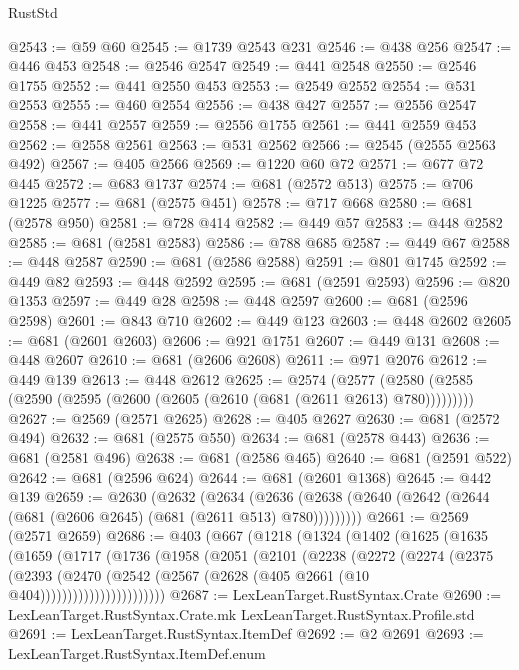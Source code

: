 \begin{lexlean}{RustStd}
\begin{coremodule}
@2543 := @59 @60
@2545 := @1739 @2543 @231
@2546 := @438 @256
@2547 := @446 @453
@2548 := @2546 @2547
@2549 := @441 @2548
@2550 := @2546 @1755
@2552 := @441 @2550 @453
@2553 := @2549 @2552
@2554 := @531 @2553
@2555 := @460 @2554
@2556 := @438 @427
@2557 := @2556 @2547
@2558 := @441 @2557
@2559 := @2556 @1755
@2561 := @441 @2559 @453
@2562 := @2558 @2561
@2563 := @531 @2562
@2566 := @2545 (@2555 @2563 @492)
@2567 := @405 @2566
@2569 := @1220 @60 @72
@2571 := @677 @72 @445
@2572 := @683 @1737
@2574 := @681 (@2572 @513)
@2575 := @706 @1225
@2577 := @681 (@2575 @451)
@2578 := @717 @668
@2580 := @681 (@2578 @950)
@2581 := @728 @414
@2582 := @449 @57
@2583 := @448 @2582
@2585 := @681 (@2581 @2583)
@2586 := @788 @685
@2587 := @449 @67
@2588 := @448 @2587
@2590 := @681 (@2586 @2588)
@2591 := @801 @1745
@2592 := @449 @82
@2593 := @448 @2592
@2595 := @681 (@2591 @2593)
@2596 := @820 @1353
@2597 := @449 @28
@2598 := @448 @2597
@2600 := @681 (@2596 @2598)
@2601 := @843 @710
@2602 := @449 @123
@2603 := @448 @2602
@2605 := @681 (@2601 @2603)
@2606 := @921 @1751
@2607 := @449 @131
@2608 := @448 @2607
@2610 := @681 (@2606 @2608)
@2611 := @971 @2076
@2612 := @449 @139
@2613 := @448 @2612
@2625 := @2574
    (@2577 (@2580 (@2585 (@2590 (@2595 (@2600 (@2605 (@2610 (@681 (@2611 @2613) @780)))))))))
@2627 := @2569 (@2571 @2625)
@2628 := @405 @2627
@2630 := @681 (@2572 @494)
@2632 := @681 (@2575 @550)
@2634 := @681 (@2578 @443)
@2636 := @681 (@2581 @496)
@2638 := @681 (@2586 @465)
@2640 := @681 (@2591 @522)
@2642 := @681 (@2596 @624)
@2644 := @681 (@2601 @1368)
@2645 := @442 @139
@2659 := @2630
    (@2632
      (@2634 (@2636 (@2638 (@2640 (@2642 (@2644 (@681 (@2606 @2645) (@681 (@2611 @513) @780)))))))))
@2661 := @2569 (@2571 @2659)
@2686 := @403
    (@667
      (@1218
        (@1324
          (@1402
            (@1625
              (@1635
                (@1659
                  (@1717
                    (@1736
                      (@1958
                        (@2051
                          (@2101
                            (@2238
                              (@2272
                                (@2274
                                  (@2375
                                    (@2393
                                      (@2470
                                        (@2542
                                          (@2567 (@2628 (@405 @2661 (@10 @404)))))))))))))))))))))))
@2687 := LexLeanTarget.RustSyntax.Crate
@2690 := LexLeanTarget.RustSyntax.Crate.mk LexLeanTarget.RustSyntax.Profile.std
@2691 := LexLeanTarget.RustSyntax.ItemDef
@2692 := @2 @2691
@2693 := LexLeanTarget.RustSyntax.ItemDef.enum

\end{coremodule}
\end{lexlean}
